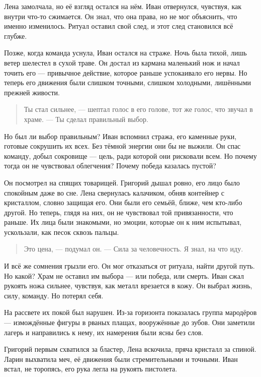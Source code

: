 \documentclass[12pt,a4paper]{book} %
\begin{document}
Лена замолчала, но её взгляд остался на нём. Иван отвернулся, чувствуя, как внутри что-то сжимается. Он знал, что она права, но не мог объяснить, что именно изменилось. Ритуал оставил свой след, и этот след становился всё глубже.

Позже, когда команда уснула, Иван остался на страже. Ночь была тихой, лишь ветер шелестел в сухой траве. Он достал из кармана маленький нож и начал точить его --- привычное действие, которое раньше успокаивало его нервы. Но теперь его движения были слишком точными, слишком холодными, лишёнными прежней живости.

\begin{quote}
Ты стал сильнее, --- шептал голос в его голове, тот же голос, что звучал в храме. --- Ты сделал правильный выбор.
\end{quote}

Но был ли выбор правильным? Иван вспомнил стража, его каменные руки, готовые сокрушить их всех. Без тёмной энергии они бы не выжили. Он спас команду, добыл сокровище --- цель, ради которой они рисковали всем. Но почему тогда он не чувствовал облегчения? Почему победа казалась пустой?

Он посмотрел на спящих товарищей. Григорий дышал ровно, его лицо было спокойным даже во сне. Лена свернулась калачиком, обняв контейнер с кристаллом, словно защищая его. Они были его семьёй, ближе, чем кто-либо другой. Но теперь, глядя на них, он не чувствовал той привязанности, что раньше. Их лица были знакомыми, но эмоции, которые он к ним испытывал, ускользали, как песок сквозь пальцы.

\begin{quote}
Это цена, --- подумал он. --- Сила за человечность. Я знал, на что иду.
\end{quote}

И всё же сомнения грызли его. Он мог отказаться от ритуала, найти другой путь. Но какой? Храм не оставил им выбора --- или победа, или смерть. Иван сжал рукоять ножа сильнее, чувствуя, как металл врезается в кожу. Он выбрал жизнь, силу, команду. Но потерял себя.

На рассвете их покой был нарушен. Из-за горизонта показалась группа мародёров --- измождённые фигуры в рваных плащах, вооружённые до зубов. Они заметили лагерь и направились к нему, их намерения были ясны без слов.

Григорий первым схватился за бластер, Лена вскочила, пряча кристалл за спиной. Ларин выхватила меч, её движения были стремительными и точными. Иван встал, не торопясь, его рука легла на рукоять пистолета.
\end{document}
